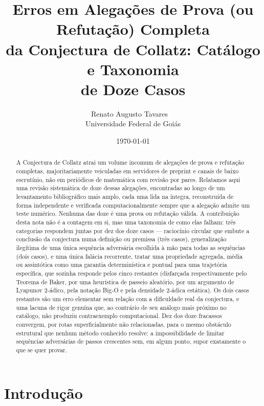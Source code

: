 \documentclass[11pt]{article}
\title{Erros em Alegações de Prova (ou Refutação) Completa\\
da Conjectura de Collatz: Catálogo e Taxonomia\\
de Doze Casos}
\author{Renato Augusto Tavares~{\small\href{mailto:dr.renatotavares@gmail.com}{\textcolor{black}{\faEnvelope}}}~\orcidlink{0009-0002-0196-3311}\\
\normalsize Universidade Federal de Goiás}
\date{\today}
\begin{document}
\maketitle

\begin{abstract}
A Conjectura de Collatz atrai um volume incomum de alegações de prova e
refutação completas, majoritariamente veiculadas em servidores de
preprint e canais de baixo escrutínio, não em periódicos de matemática
com revisão por pares. Relatamos aqui uma revisão sistemática de doze
dessas alegações, encontradas ao longo de um levantamento bibliográfico
mais amplo, cada uma lida na íntegra, reconstruída de forma
independente e verificada computacionalmente sempre que a alegação
admite um teste numérico. Nenhuma das doze é uma prova ou refutação
válida. A contribuição desta nota não é a contagem em si, mas uma
taxonomia de como elas falham: três categorias respondem juntas por dez
dos doze casos --- raciocínio circular que embute a conclusão da
conjectura numa definição ou premissa (três casos), generalização
ilegítima de uma única sequência adversária escolhida à mão para todas
as sequências (dois casos), e uma única falácia recorrente, tratar uma
propriedade agregada, média ou assintótica como uma garantia
determinística e pontual para uma trajetória específica, que sozinha
responde pelos cinco restantes (disfarçada respectivamente pelo Teorema
de Baker, por uma heurística de passeio aleatório, por um argumento de
Lyapunov 2-ádico, pela notação Big-O e pela densidade 2-ádica
estática). Os dois casos restantes são um erro elementar sem relação
com a dificuldade real da
conjectura, e uma lacuna de rigor genuína que, ao contrário de seu
análogo mais próximo no catálogo, não produziu contraexemplo
computacional. Dez dos doze fracassos convergem, por rotas
superficialmente não relacionadas, para o mesmo obstáculo estrutural
que nenhum método conhecido resolve: a impossibilidade de limitar
sequências adversárias de passos crescentes sem, em algum ponto, supor
exatamente o que se quer provar.
\end{abstract}

\section{Introdução}
\label{sec:intro}
\end{document}
